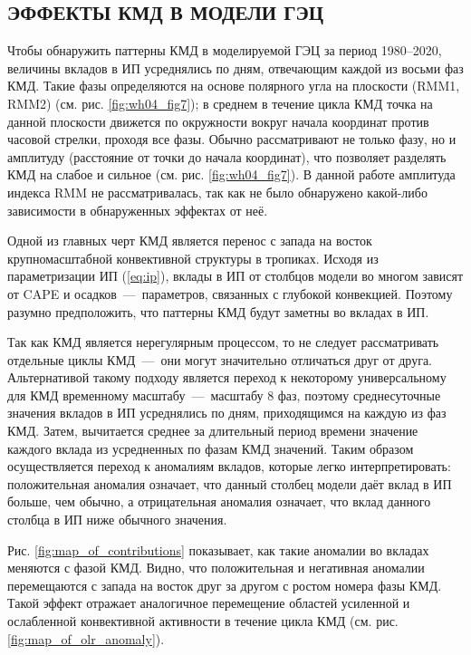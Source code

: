\subsection{ЭФФЕКТЫ КМД В МОДЕЛИ ГЭЦ}

Чтобы обнаружить паттерны КМД в моделируемой ГЭЦ за период 1980--2020, величины вкладов в ИП усреднялись по дням, отвечающим каждой из восьми фаз КМД. Такие фазы определяются на основе полярного угла на плоскости (RMM1, RMM2) (см. рис. \ref{fig:wh04_fig7}); в среднем в течение цикла КМД точка на данной плоскости движется по окружности вокруг начала координат против часовой стрелки, проходя все фазы. Обычно рассматривают не только фазу, но и амплитуду (расстояние от точки до начала координат), что позволяет разделять КМД на слабое и сильное (см. рис. \ref{fig:wh04_fig7}). В данной работе амплитуда индекса RMM не рассматривалась, так как не было обнаружено какой-либо зависимости в обнаруженных эффектах от неё.

Одной из главных черт КМД является перенос с запада на восток крупномасштабной конвективной структуры в тропиках. Исходя из параметризации ИП (\ref{eq:ip}), вклады в ИП от столбцов модели во многом зависят от CAPE и осадков~---~параметров, связанных с глубокой конвекцией. Поэтому разумно предположить, что паттерны КМД будут заметны во вкладах в ИП.

Так как КМД является нерегулярным процессом, то не следует рассматривать отдельные циклы КМД~---~они могут значительно отличаться друг от друга. Альтернативой такому подходу является переход к некоторому универсальному для КМД временному масштабу~---~масштабу 8 фаз, поэтому среднесуточные значения вкладов в ИП усреднялись по дням, приходящимся на каждую из фаз КМД. Затем, вычитается среднее за длительный период времени значение каждого вклада из усредненных по фазам КМД значений. Таким образом осуществляется переход к аномалиям вкладов, которые легко интерпретировать: положительная аномалия означает, что данный столбец модели даёт вклад в ИП больше, чем обычно, а отрицательная аномалия означает, что вклад данного столбца в ИП ниже обычного значения.

Рис. \ref{fig:map_of_contributions} показывает, как такие аномалии во вкладах меняются с фазой КМД. Видно, что положительная и негативная аномалии перемещаются с запада на восток друг за другом с ростом номера фазы КМД. Такой эффект отражает аналогичное перемещение областей усиленной и ослабленной конвективной активности в течение цикла КМД (см. рис. \ref{fig:map_of_olr_anomaly}).

